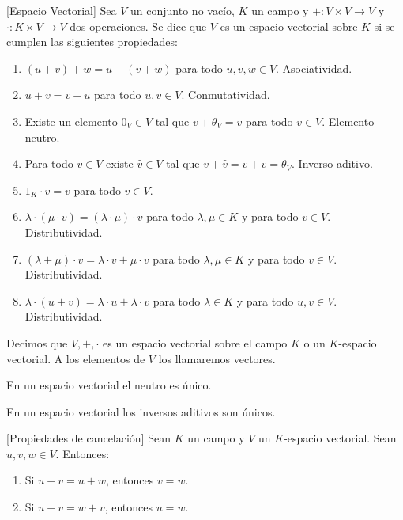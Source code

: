 \begin{definition}{}{}[Espacio Vectorial]\label{def-espacio_vectorial}
    Sea $V$ un conjunto no vacío, $K$ un campo y $+:V\times V\rightarrow V$ y $\cdot:K\times V\rightarrow V$ dos operaciones. Se dice que $V$ es un espacio vectorial sobre $K $ si se cumplen las siguientes propiedades: 
    \begin{enumerate}
        \item $(u+v)+w = u+(v+w)$ para todo $u,v,w\in V$. Asociatividad.
        \item $u+v = v+u$ para todo $u,v\in V$. Conmutatividad.
        \item Existe un elemento $0_V\in V$ tal que $v+\theta_V=v$ para todo $v\in V$. Elemento neutro.
        \item Para todo $v \in V$ existe $\hat{v} \in V$ tal que $v+\hat{v}=\hat{v}+v = \theta_V$. Inverso aditivo.
        \item $1_K \cdot v = v$ para todo $v\in V$. 
        \item $\lambda \cdot(\mu \cdot v) = (\lambda \cdot \mu) \cdot v$ para todo $\lambda,\mu \in K$ y para todo $v\in V$. Distributividad.
        \item $(\lambda + \mu) \cdot v = \lambda \cdot v + \mu \cdot v$ para todo $\lambda,\mu \in K$ y para todo $v\in V$. Distributividad.
        \item $\lambda \cdot (u+v) = \lambda \cdot u + \lambda \cdot v$ para todo $\lambda \in K$ y para todo $u,v\in V$. Distributividad.
    \end{enumerate}
    Decimos que $V,+,\cdot$ es un espacio vectorial sobre el campo $K$ o un $K$-espacio vectorial. A los elementos de $V$ los llamaremos vectores.
\end{definition}
\begin{proposition}{}{}
    En un espacio vectorial el neutro es único.
\end{proposition}
\begin{proposition}{}{}
    En un espacio vectorial los inversos aditivos son únicos.
\end{proposition}
\begin{proposition}{}{}[Propiedades de cancelación]
    Sean $K$ un campo y $V$ un $K$-espacio vectorial. Sean $u,v,w\in V$. Entonces:
    \begin{enumerate}
        \item Si $u+v=u+w$, entonces $v=w$.
        \item Si $u+v=w+v$, entonces $u=w$.
    \end{enumerate}
\end{proposition}
